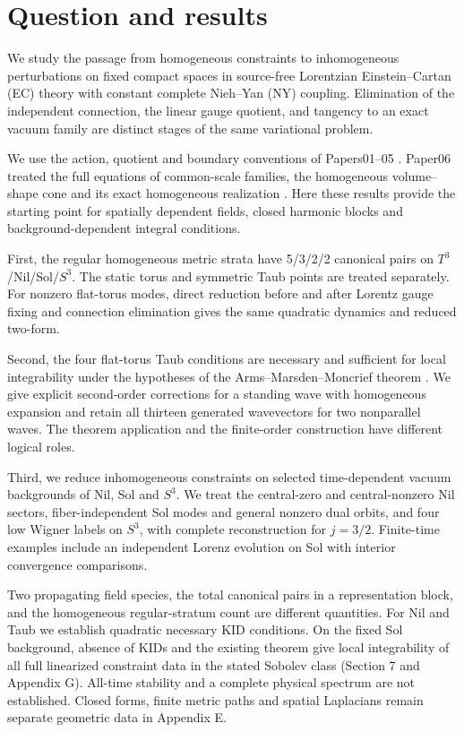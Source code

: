 \section{Question and results}

We study the passage from homogeneous constraints to inhomogeneous perturbations on fixed compact spaces in source-free Lorentzian Einstein--Cartan (EC) theory with constant complete Nieh--Yan (NY) coupling. Elimination of the independent connection, the linear gauge quotient, and tangency to an exact vacuum family are distinct stages of the same variational problem.

We use the action, quotient and boundary conventions of Papers01--05 \cite{paper1,paper2,paper3,paper3ec,paper4,paper5}. Paper06 treated the full equations of common-scale families, the homogeneous volume--shape cone and its exact homogeneous realization \cite{paper6}. Here these results provide the starting point for spatially dependent fields, closed harmonic blocks and background-dependent integral conditions.

First, the regular homogeneous metric strata have 5/3/2/2 canonical pairs on $T^3$/Nil/Sol/$S^3$. The static torus and symmetric Taub points are treated separately. For nonzero flat-torus modes, direct reduction before and after Lorentz gauge fixing and connection elimination gives the same quadratic dynamics and reduced two-form.

Second, the four flat-torus Taub conditions are necessary and sufficient for local integrability under the hypotheses of the Arms--Marsden--Moncrief theorem \cite{ArmsMarsdenMoncrief1982}. We give explicit second-order corrections for a standing wave with homogeneous expansion and retain all thirteen generated wavevectors for two nonparallel waves. The theorem application and the finite-order construction have different logical roles.

Third, we reduce inhomogeneous constraints on selected time-dependent vacuum backgrounds of Nil, Sol and $S^3$. We treat the central-zero and central-nonzero Nil sectors, fiber-independent Sol modes and general nonzero dual orbits, and four low Wigner labels on $S^3$, with complete reconstruction for $j=3/2$. Finite-time examples include an independent Lorenz evolution on Sol with interior convergence comparisons.

Two propagating field species, the total canonical pairs in a representation block, and the homogeneous regular-stratum count are different quantities. For Nil and Taub we establish quadratic necessary KID conditions. On the fixed Sol background, absence of KIDs and the existing theorem give local integrability of all full linearized constraint data in the stated Sobolev class (Section 7 and Appendix G). All-time stability and a complete physical spectrum are not established. Closed forms, finite metric paths and spatial Laplacians remain separate geometric data in Appendix E.

